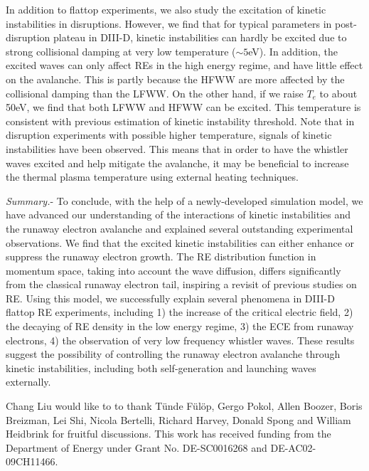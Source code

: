 \documentclass[aps, prl, preprint,english,superscriptaddress]{revtex4-1}
\begin{document}
In addition to flattop experiments, we also study the excitation of kinetic instabilities in disruptions. However, we find that for typical parameters in post-disruption plateau in DIII-D, kinetic instabilities can hardly be excited due to strong collisional damping at very low temperature ($\sim 5$eV). In addition, the excited waves can only affect REs in the high energy regime, and have little effect on the avalanche. This is partly because the HFWW are more affected by the collisional damping than the LFWW\cite{aleynikov_stability_2015}. On the other hand, if we raise $T_e$ to about 50eV, we find that both LFWW and HFWW can be excited. This temperature is consistent with previous estimation of kinetic instability threshold\cite{aleynikov_stability_2015}. Note that in disruption experiments with possible higher temperature\cite{fredrickson_control_2015}, signals of kinetic instabilities have been observed. This means that in order to have the whistler waves excited and help mitigate the avalanche, it may be beneficial to increase the thermal plasma temperature using external heating techniques.

\textit{Summary.}-
To conclude, with the help of a newly-developed simulation model, we have advanced our understanding of the interactions of kinetic instabilities and the runaway electron avalanche and explained several outstanding experimental observations. We find that the excited kinetic instabilities can either enhance or suppress the runaway electron growth. The RE distribution function in momentum space, taking into account the wave diffusion, differs significantly from the classical runaway electron tail, inspiring a revisit of previous studies on RE. Using this model, we successfully explain several phenomena in DIII-D flattop RE experiments, including 1) the increase of the critical electric field, 2) the decaying of RE density in the low energy regime, 3) the ECE from runaway electrons, 4) the observation of very low frequency whistler waves.
These results suggest the possibility of controlling the runaway electron avalanche through kinetic instabilities, including both self-generation and launching waves externally.
\begin{acknowledgments}
Chang Liu would like to to thank T\"{u}nde F\"{u}l\"{o}p, Gergo Pokol, Allen Boozer, Boris Breizman, Lei Shi, Nicola Bertelli, Richard Harvey, Donald Spong and William Heidbrink for fruitful discussions. This work has received funding from
the Department of Energy 
under Grant No. DE-SC0016268 and DE-AC02-09CH11466.
\end{acknowledgments}

		
\end{document}
